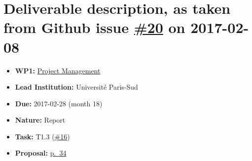 \section*{\texorpdfstring{Deliverable description, as taken from Github
issue
\href{https://github.com/OpenDreamKit/OpenDreamKit/issues/20}{\#20} on
2017-02-08}{Deliverable description, as taken from Github issue \#20 on 2017-02-28}}\label{deliverable-description-as-taken-from-github-issue-20-on-2017-02-28}

\begin{itemize}
\tightlist
\item
  \textbf{WP1:}
  \href{https://github.com/OpenDreamKit/OpenDreamKit/tree/master/WP1}{Project
  Management}
\item
  \textbf{Lead Institution:} Université Paris-Sud
\item
  \textbf{Due:} 2017-02-28 (month 18)
\item
  \textbf{Nature:} Report
\item
  \textbf{Task:} T1.3
  (\href{https://github.com/OpenDreamKit/OpenDreamKit/issues/16}{\#16})
\item
  \textbf{Proposal:}
  \href{https://github.com/OpenDreamKit/OpenDreamKit/raw/master/Proposal/proposal-www.pdf}{p.~34}
\end{itemize}
